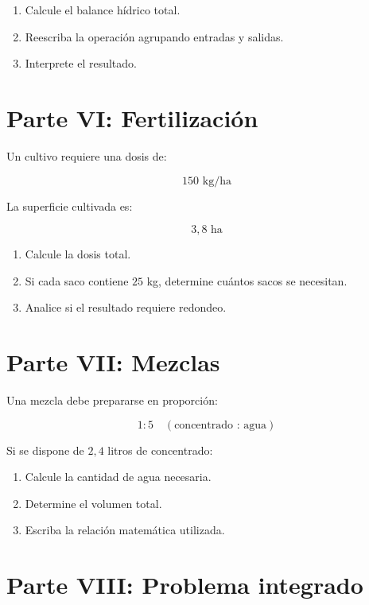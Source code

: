\documentclass[12pt]{article}
\begin{document}
	\begin{enumerate}
		\item Calcule el balance hídrico total.
		\item Reescriba la operación agrupando entradas y salidas.
		\item Interprete el resultado.
	\end{enumerate}
	
	\newpage
	
	\vspace*{2em}
	
	\section*{Parte VI: Fertilización}
	
	Un cultivo requiere una dosis de:
	
	\[
	150 \text{ kg/ha}
	\]
	
	La superficie cultivada es:
	
	\[
	3{,}8 \text{ ha}
	\]
	
	\begin{enumerate}
		\item Calcule la dosis total.
		\item Si cada saco contiene $25$ kg, determine cuántos sacos se necesitan.
		\item Analice si el resultado requiere redondeo.
	\end{enumerate}
	
	\section*{Parte VII: Mezclas}
	
	Una mezcla debe prepararse en proporción:
	
	\[
	1 : 5 \quad (\text{concentrado : agua})
	\]
	
	Si se dispone de $2{,}4$ litros de concentrado:
	
	\begin{enumerate}
		\item Calcule la cantidad de agua necesaria.
		\item Determine el volumen total.
		\item Escriba la relación matemática utilizada.
	\end{enumerate}
	
	\section*{Parte VIII: Problema integrado}
	
\end{document}

